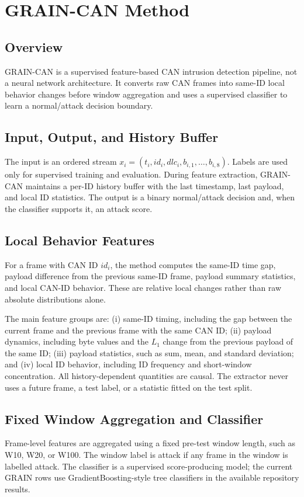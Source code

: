 \documentclass[runningheads]{llncs}
\begin{document}
\section{GRAIN-CAN Method}
\subsection{Overview}
GRAIN-CAN is a supervised feature-based CAN intrusion detection pipeline, not a neural network architecture.  It converts raw CAN frames into same-ID local behavior changes before window aggregation and uses a supervised classifier to learn a normal/attack decision boundary.

\subsection{Input, Output, and History Buffer}
The input is an ordered stream \(x_i=(t_i,id_i,dlc_i,b_{i,1},\ldots,b_{i,8})\).  Labels are used only for supervised training and evaluation.  During feature extraction, GRAIN-CAN maintains a per-ID history buffer with the last timestamp, last payload, and local ID statistics.  The output is a binary normal/attack decision and, when the classifier supports it, an attack score.

\subsection{Local Behavior Features}
For a frame with CAN ID \(id_i\), the method computes the same-ID time gap, payload difference from the previous same-ID frame, payload summary statistics, and local CAN-ID behavior.  These are relative local changes rather than raw absolute distributions alone.

The main feature groups are: (i) same-ID timing, including the gap between the current frame and the previous frame with the same CAN ID; (ii) payload dynamics, including byte values and the \(L_1\) change from the previous payload of the same ID; (iii) payload statistics, such as sum, mean, and standard deviation; and (iv) local ID behavior, including ID frequency and short-window concentration.  All history-dependent quantities are causal.  The extractor never uses a future frame, a test label, or a statistic fitted on the test split.

\subsection{Fixed Window Aggregation and Classifier}
Frame-level features are aggregated using a fixed pre-test window length, such as W10, W20, or W100.  The window label is attack if any frame in the window is labelled attack.  The classifier is a supervised score-producing model; the current GRAIN rows use GradientBoosting-style tree classifiers in the available repository results.
\end{document}
